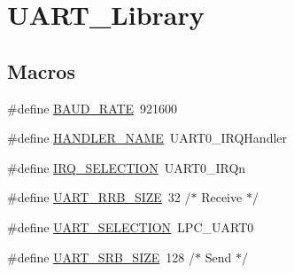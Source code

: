 \hypertarget{group__UART__Library}{}\section{U\+A\+R\+T\+\_\+\+Library}
\label{group__UART__Library}
\subsection*{Macros}
\begin{DoxyCompactItemize}
\item 
\#define \hyperlink{group__UART__Library_gad4455691936f92fdd6c37566fc58ba1f}{B\+A\+U\+D\+\_\+\+R\+A\+TE}~921600
\item 
\#define \hyperlink{group__UART__Library_gafa87a27ed6f715eb90d4db80687e93bf}{H\+A\+N\+D\+L\+E\+R\+\_\+\+N\+A\+ME}~U\+A\+R\+T0\+\_\+\+I\+R\+Q\+Handler
\item 
\#define \hyperlink{group__UART__Library_ga7c3d3b9d5cf2685f7fdb298eaf359875}{I\+R\+Q\+\_\+\+S\+E\+L\+E\+C\+T\+I\+ON}~U\+A\+R\+T0\+\_\+\+I\+R\+Qn
\item 
\#define \hyperlink{group__UART__Library_gaf9c71990720971fa35b971b5e305c05b}{U\+A\+R\+T\+\_\+\+R\+R\+B\+\_\+\+S\+I\+ZE}~32	/$\ast$ Receive $\ast$/
\item 
\#define \hyperlink{group__UART__Library_ga43200fe4a9ea07a8a7f41b484fce9a18}{U\+A\+R\+T\+\_\+\+S\+E\+L\+E\+C\+T\+I\+ON}~L\+P\+C\+\_\+\+U\+A\+R\+T0
\item 
\#define \hyperlink{group__UART__Library_ga5fe77d3c1b35665239feac7a45b514a6}{U\+A\+R\+T\+\_\+\+S\+R\+B\+\_\+\+S\+I\+ZE}~128	/$\ast$ Send $\ast$/
\end{DoxyCompactItemize}
